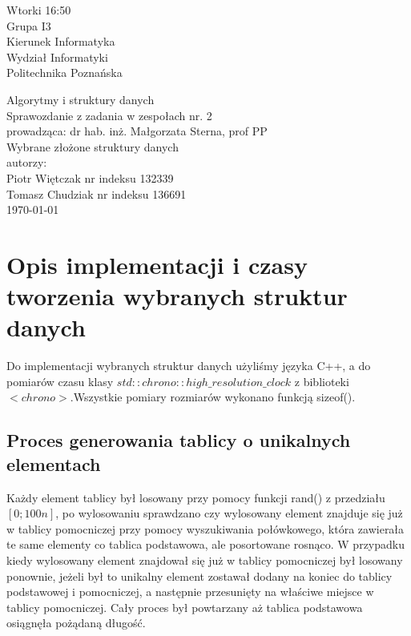 \documentclass[polish,polish,a4paper]{article}
\begin{document}
	
		\begin{titlepage}
			\begin{flushright}
				{ Wtorki 16:50\\
					Grupa I3\\
					Kierunek Informatyka\\
					Wydział Informatyki\\
					Politechnika Poznańska}
			\end{flushright}
		\vspace*{\fill}
		\begin{center}
			{\Large Algorytmy i struktury danych \\[0.1cm]
				Sprawozdanie z zadania w zespołach nr. 2\\[0.1cm]
				prowadząca: dr hab. inż. Małgorzata Sterna, prof PP}\\
			{\Huge Wybrane złożone struktury danych\\ [0.4cm]}
			{\large autorzy:\\[0.1cm]}
			{\large Piotr Więtczak nr indeksu 132339\\[0.1cm] Tomasz Chudziak nr indeksu 136691}\\[0.5cm]
			\today
		\end{center}
		\vspace*{\fill}
	\end{titlepage}

\section{Opis implementacji i czasy tworzenia wybranych struktur danych}

	
Do implementacji wybranych struktur danych użyliśmy języka C++, a do pomiarów czasu klasy $ std::chrono::high\_resolution\_clock $  z biblioteki $<chrono>$.Wszystkie pomiary rozmiarów wykonano funkcją sizeof().

\subsection*{Proces generowania tablicy o unikalnych elementach}

Każdy element tablicy był losowany przy pomocy funkcji rand() z przedziału $ [0;100n]$, po wylosowaniu sprawdzano czy wylosowany element znajduje się już w tablicy pomocniczej przy pomocy wyszukiwania połówkowego, która zawierała te same elementy co tablica podstawowa, ale posortowane rosnąco. W przypadku kiedy wylosowany element znajdował się już w tablicy pomocniczej był losowany ponownie, jeżeli był to unikalny element zostawał dodany na koniec do tablicy podstawowej i pomocniczej, a następnie przesunięty na właściwe miejsce w tablicy pomocniczej. Cały proces był powtarzany aż tablica podstawowa osiągnęła pożądaną długość.
\end{document}
